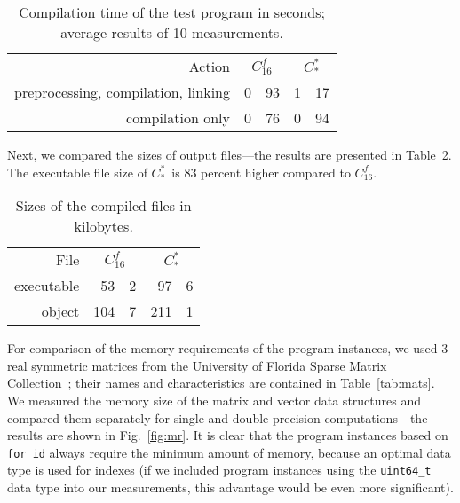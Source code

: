 \documentclass[10pt,a4paper]{article}
\theoremstyle{definition}\newtheorem{problem}{Problem}
\providecommand{\forid}{\texttt{for\_id}\xspace}
\providecommand{\casex}[1]{\ensuremath{#1}}
\providecommand{\caseA}{\casex{C_{16}^f}}
\providecommand{\caseE}{\casex{C_*^*}}
\begin{document}
\renewcommand{\arraystretch}{1.00}
\renewcommand{\tabcolsep}{3mm}
\begin{table}[t]
\caption{Compilation time of the test program in seconds; average results of 10 measurements.}
\begin{center}
\begin{tabular}{r*{2}{r@{.}l}}
\toprule
Action & \multicolumn{2}{c}{\caseA} & \multicolumn{2}{c}{\caseE} \\ \cmidrule(r){1-1} \cmidrule(l){2-5} 
preprocessing, compilation, linking & 0 & 93 & 1 & 17 \\
compilation only & 0 & 76 & 0 & 94 \\
\bottomrule
\end{tabular}
\end{center}
\label{tab:cts}
\end{table}

Next, we compared the sizes of output files---the results are presented in Table~\ref{tab:fss}. The executable file size of \caseE\ is 83 percent higher compared to \caseA.

\renewcommand{\arraystretch}{1.00}
\renewcommand{\tabcolsep}{3mm}
\begin{table}[t]
\caption{Sizes of the compiled files in kilobytes.}
\begin{center}
\begin{tabular}{r*{2}{r@{.}l}}
\toprule
File & \multicolumn{2}{c}{\caseA} & \multicolumn{2}{c}{\caseE \rule[-0.5em]{0pt}{1.7em}} \\ \cmidrule(r){1-1} \cmidrule(l){2-5}
executable & 53 & 2 & 97 & 6 \rule[0em]{0pt}{1em} \\
object & 104 & 7 & 211 & 1 \\
\bottomrule
\end{tabular}
\end{center}
\label{tab:fss}
\end{table}

For comparison of the memory requirements of the program instances, we used 3 real symmetric matrices from the University of Florida Sparse Matrix Collection~\cite{RefWorks:43}; their names and characteristics are contained in Table~\ref{tab:mats}. We measured the memory size of the matrix and vector data structures and compared them separately for single and double precision computations---the results are shown in Fig.~\ref{fig:mr}. It is clear that the program instances based on \forid always require the minimum amount of memory, because an optimal data type is used for indexes (if we included program instances using the \texttt{uint64\_t} data type into our measurements, this advantage would be even more significant).
\end{document}
